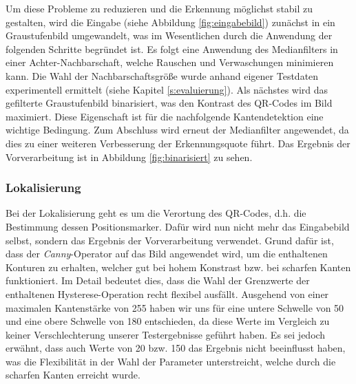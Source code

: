 \documentclass[a4paper, oneside, 12pt]{article}
\begin{document}
Um diese Probleme zu reduzieren und die Erkennung möglichst stabil zu gestalten, wird die Eingabe (siehe Abbildung \ref{fig:eingabebild}) zunächst in ein Graustufenbild umgewandelt, was im Wesentlichen durch die Anwendung der folgenden Schritte begründet ist.
Es folgt eine Anwendung des Medianfilters in einer Achter-Nachbarschaft, welche Rauschen und Verwaschungen minimieren kann. Die Wahl der Nachbarschaftsgröße wurde anhand eigener Testdaten experimentell ermittelt (siehe Kapitel \ref{s:evaluierung}).
Als nächstes wird das gefilterte Graustufenbild binarisiert, was den Kontrast des QR-Codes im Bild maximiert. Diese Eigenschaft ist für die nachfolgende Kantendetektion eine wichtige Bedingung.
Zum Abschluss wird erneut der Medianfilter angewendet, da dies zu einer weiteren Verbesserung der Erkennungsquote führt.
Das Ergebnis der Vorverarbeitung ist in Abbildung \ref{fig:binarisiert} zu sehen.

\subsubsection{Lokalisierung}

Bei der Lokalisierung geht es um die Verortung des QR-Codes, d.h. die Bestimmung dessen Positionsmarker. Dafür wird nun nicht mehr das Eingabebild selbst, sondern das Ergebnis der Vorverarbeitung verwendet.
Grund dafür ist, dass der \emph{Canny}-Operator \cite{CANNY} auf das Bild angewendet wird, um die enthaltenen Konturen zu erhalten, welcher gut bei hohem Konstrast bzw. bei scharfen Kanten funktioniert. Im Detail bedeutet dies, dass die Wahl der Grenzwerte der enthaltenen Hysterese-Operation recht flexibel ausfällt. Ausgehend von einer maximalen Kantenstärke von 255 haben wir uns für eine untere Schwelle von 50 und eine obere Schwelle von 180 entschieden, da diese Werte im Vergleich zu keiner Verschlechterung unserer Testergebnisse geführt haben. Es sei jedoch erwähnt, dass auch Werte von 20 bzw. 150 das Ergebnis nicht beeinflusst haben, was die Flexibilität in der Wahl der Parameter unterstreicht, welche durch die scharfen Kanten erreicht wurde.
\end{document}
